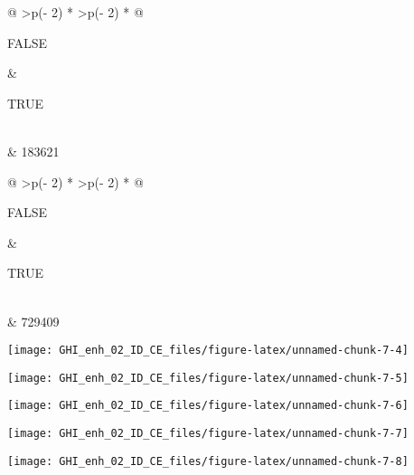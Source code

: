 \documentclass[
  10pt,
  a4paper,oneside]{article}
\begin{document}
\begin{longtable}[]{@{}
  >{\raggedleft\arraybackslash}p{(\columnwidth - 2\tabcolsep) * }
  >{\raggedleft\arraybackslash}p{(\columnwidth - 2\tabcolsep) * }@{}}
\toprule\noalign{}
\begin{minipage}[b]{\linewidth}\raggedleft
FALSE
\end{minipage} & \begin{minipage}[b]{\linewidth}\raggedleft
TRUE
\end{minipage} \\
\midrule\noalign{}
\endhead
\bottomrule\noalign{}
 & 183621 \\
\end{longtable}

\begin{longtable}[]{@{}
  >{\raggedleft\arraybackslash}p{(\columnwidth - 2\tabcolsep) * }
  >{\raggedleft\arraybackslash}p{(\columnwidth - 2\tabcolsep) * }@{}}
\toprule\noalign{}
\begin{minipage}[b]{\linewidth}\raggedleft
FALSE
\end{minipage} & \begin{minipage}[b]{\linewidth}\raggedleft
TRUE
\end{minipage} \\
\midrule\noalign{}
\endhead
\bottomrule\noalign{}
 & 729409 \\
\end{longtable}

\begin{center}\texttt{[image: GHI\_enh\_02\_ID\_CE\_files/figure-latex/unnamed-chunk-7-4]} \end{center}

\begin{center}\texttt{[image: GHI\_enh\_02\_ID\_CE\_files/figure-latex/unnamed-chunk-7-5]} \end{center}

\begin{center}\texttt{[image: GHI\_enh\_02\_ID\_CE\_files/figure-latex/unnamed-chunk-7-6]} \end{center}

\begin{center}\texttt{[image: GHI\_enh\_02\_ID\_CE\_files/figure-latex/unnamed-chunk-7-7]} \end{center}

\begin{center}\texttt{[image: GHI\_enh\_02\_ID\_CE\_files/figure-latex/unnamed-chunk-7-8]} \end{center}
\end{document}
